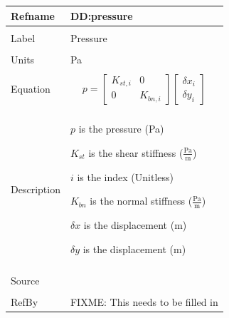 \documentclass[12pt]{article}
\begin{document}
\noindent \begin{minipage}{\textwidth}
\begin{tabular}{p{} p{}}
\toprule \textbf{Refname} & \textbf{DD:pressure}
\label{DD:pressure}
\\ \midrule \\
Label & Pressure
\\ \midrule \\
Units & Pa
\\ \midrule \\
Equation & \begin{dmath}
           p=\begin{bmatrix}
{K_{st,i}} & 0\\
0 & {K_{bn,i}}
\end{bmatrix} \begin{bmatrix}
{δx}_{i}\\
{δy}_{i}
\end{bmatrix}
 	   \end{dmath}
\\ \midrule \\
Description & \begin{symbDescription}
              \item{$p$ is the pressure (Pa)}
              \item{${K_{st}}$ is the shear stiffness ($\frac{\text{Pa}}{\text{m}}$)}
              \item{$i$ is the index (Unitless)}
              \item{${K_{bn}}$ is the normal stiffness ($\frac{\text{Pa}}{\text{m}}$)}
              \item{$δx$ is the displacement (m)}
              \item{$δy$ is the displacement (m)}
              \end{symbDescription}
\\ \midrule \\
Source &
\\ \midrule \\
RefBy & FIXME: This needs to be filled in
\\ \bottomrule \end{tabular}
\end{minipage}\\
~\newline
\end{document}
